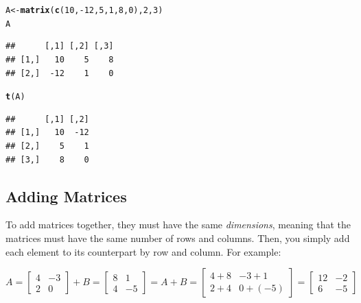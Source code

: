 \documentclass[11pt,openany]{book}\usepackage[]{graphicx}\usepackage[]{color}
\makeatletter
\newcommand{\hlnum}[1]{\textcolor[rgb]{0.686,0.059,0.569}{#1}}%
\newcommand{\hlopt}[1]{\textcolor[rgb]{0,0,0}{#1}}%
\newcommand{\hlstd}[1]{\textcolor[rgb]{0.345,0.345,0.345}{#1}}%
\newcommand{\hlkwb}[1]{\textcolor[rgb]{0.69,0.353,0.396}{#1}}%
\newcommand{\hlkwd}[1]{\textcolor[rgb]{0.737,0.353,0.396}{\textbf{#1}}}%
\newenvironment{kframe}{%
 \def\at@end@of@kframe{}%
 \ifinner\ifhmode%
  \def\at@end@of@kframe{\end{minipage}}%
  \begin{minipage}{\columnwidth}%
 \fi\fi%
 \def\FrameCommand##1{\hskip\@totalleftmargin \hskip-\fboxsep
 \colorbox{shadecolor}{##1}\hskip-\fboxsep
     \hskip-\linewidth \hskip-\@totalleftmargin \hskip\columnwidth}%
 \MakeFramed {\advance\hsize-\width
   \@totalleftmargin\z@ \linewidth\hsize
   \@setminipage}}%
 {\par\unskip\endMakeFramed%
 \at@end@of@kframe}
\newenvironment{knitrout}{}{} %
\renewenvironment{knitrout}{\begin{singlespace}}{\end{singlespace}}
\makeatother
\begin{document}
\begin{knitrout}
\color{fgcolor}\begin{kframe}
\begin{alltt}
\hlstd{A} \hlkwb{<-} \hlkwd{matrix}\hlstd{(}\hlkwd{c}\hlstd{(}\hlnum{10}\hlstd{,} \hlopt{-}\hlnum{12}\hlstd{,} \hlnum{5}\hlstd{,} \hlnum{1}\hlstd{,} \hlnum{8}\hlstd{,} \hlnum{0}\hlstd{),} \hlnum{2}\hlstd{,} \hlnum{3}\hlstd{)}
\hlstd{A}
\end{alltt}
\begin{verbatim}
##      [,1] [,2] [,3]
## [1,]   10    5    8
## [2,]  -12    1    0
\end{verbatim}
\begin{alltt}
\hlkwd{t}\hlstd{(A)}
\end{alltt}
\begin{verbatim}
##      [,1] [,2]
## [1,]   10  -12
## [2,]    5    1
## [3,]    8    0
\end{verbatim}
\end{kframe}
\end{knitrout}


\subsection{Adding Matrices}

To add matrices together, they must have the same \textit{dimensions}, meaning that the matrices must have the same number of rows and columns. Then, you simply add each element to its counterpart by row and column. For example:  

$A =
\begin{bmatrix}
4 & -3 \\
2 & 0 
\end{bmatrix}
+
B =
\begin{bmatrix}
8 & 1 \\
4 & -5
\end{bmatrix}
=
A+B = 
\begin{bmatrix}
4+8 & -3+1 \\
2+4 & 0+(-5)
\end{bmatrix}
=
\begin{bmatrix}
  12 & -2 \\
  6 & -5
\end{bmatrix}$
\end{document}
